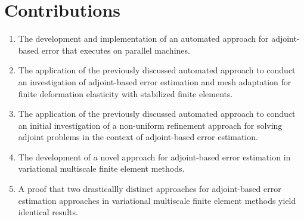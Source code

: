 \section{Contributions}

\begin{enumerate}
\item The development and implementation of an automated approach
for adjoint-based error that executes on parallel machines.
\item The application of the previously discussed automated approach
to conduct an investigation of adjoint-based error estimation and mesh
adaptation for finite deformation elasticity with stabilized finite
elements.
\item The application of the previously discussed automated approach
to conduct an initial investigation of a non-uniform refinement approach
for solving adjoint problems in the context of adjoint-based error
estimation.
\item The development of a novel approach for adjoint-based error
estimation in variational multiscale finite element methods.
\item A proof that two drasticallly distinct approaches for
adjoint-based error estimation approaches in variational multiscale
finite element methods yield identical results.
\end{enumerate}
